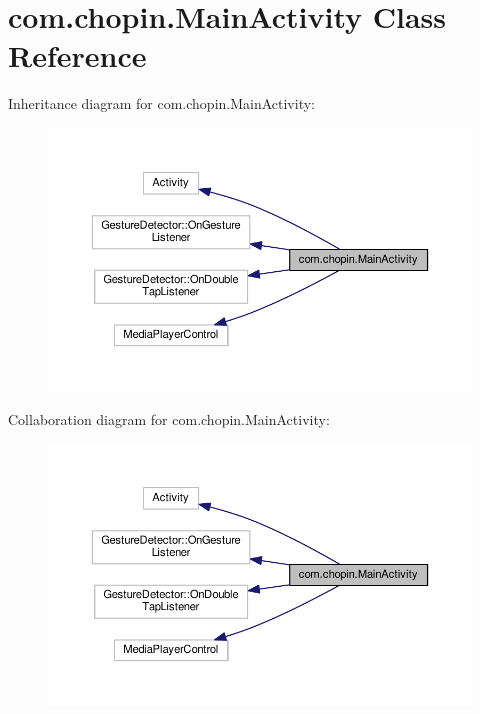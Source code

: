 \hypertarget{classcom_1_1chopin_1_1MainActivity}{}\section{com.\+chopin.\+Main\+Activity Class Reference}
\label{classcom_1_1chopin_1_1MainActivity}


Inheritance diagram for com.\+chopin.\+Main\+Activity\+:\nopagebreak
\begin{figure}[H]
\begin{center}
\leavevmode
\includegraphics[width=350pt]{classcom_1_1chopin_1_1MainActivity__inherit__graph}
\end{center}
\end{figure}


Collaboration diagram for com.\+chopin.\+Main\+Activity\+:\nopagebreak
\begin{figure}[H]
\begin{center}
\leavevmode
\includegraphics[width=350pt]{classcom_1_1chopin_1_1MainActivity__coll__graph}
\end{center}
\end{figure}
